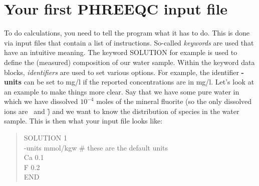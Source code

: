 \newpage

\section{Your first PHREEQC input file}
To do calculations, you need to tell the program what it has to do. This is done via input files that
contain a list of instructions. So-called \textit{keywords} are used that have an intuitive meaning. The keyword
SOLUTION for example is used to define the (measured) composition of our water sample. Within
the keyword data blocks, \textit{identifiers} are used to set various options. For example, the identifier \textbf{-units}
can be set to mg/l if the reported concentrations are in mg/l.
Let's look at an example to make things more clear. Say that we have some pure water in which we
have dissolved $10^{-4}$ moles of the mineral fluorite (so the only dissolved ions are \ca\ and \f) and we want to know
the distribution of species in the water sample. This is then what your input file looks like:

\begin{quote}
SOLUTION 1 \\
-units mmol/kgw \# these are the default units \\
Ca 0.1 \\
F 0.2 \\
END \\
\end{quote}

